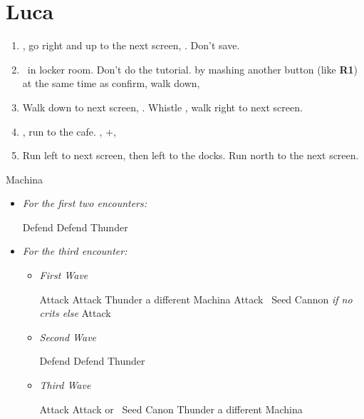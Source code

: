 \chapter{Luca}

\begin{enumerate}
	\item \sd, go right and up to the next screen, \cs[2:30]. Don't save.
	\item \sd\ in locker room. Don't do the tutorial. \sd by mashing another button (like \textbf{R1}) at the same time as confirm, walk down, \sd
	\item Walk down to next screen, \sd. Whistle \cs[0:30], walk right to next screen.
	\item \sd, run to the cafe. \sd, \skippablefmv+\cs[1:20], \sd
	\item Run left to next screen, then left to the docks. Run north to the next screen.
\end{enumerate}
\begin{battle}{Machina}
	\begin{itemize}
		\item \textit{For the first two encounters:}
		      \begin{itemize}
			      \tidusf Defend
			      \kimahrif Defend
			      \luluf Thunder
		      \end{itemize}
		\item \textit{For the third encounter:}
		      \begin{itemize}
			      \item \textit{First Wave}
			            \begin{itemize}
				            \tidusf Attack
				            \kimahrif Attack
				            \luluf Thunder a different Machina
				            \tidusf Attack
				            \kimahrif \od\ Seed Cannon \textit{if no crits else} Attack
			            \end{itemize}
			      \item \textit{Second Wave}
			            \begin{itemize}
				            \tidusf Defend
				            \kimahrif Defend
				            \luluf Thunder
			            \end{itemize}
			      \item \textit{Third Wave}
			            \begin{itemize}
				            \tidusf Attack
				            \kimahrif Attack or \od\ Seed Canon
				            \luluf Thunder a different Machina
			            \end{itemize}
		      \end{itemize}
	\end{itemize}
\end{battle}
